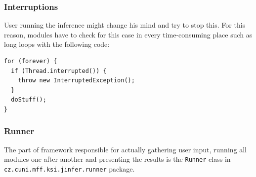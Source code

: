 \documentclass[a4paper,10pt,oneside]{article}
\newcommand{\code}[1]{\texttt{#1}}
\begin{document}
\subsubsection{Interruptions}
User running the inference might change his mind and try to stop this. For this reason, modules have to check for this case in every time-consuming place such as long loops with the following code:
\begin{verbatim}
for (forever) {
  if (Thread.interrupted()) {
    throw new InterruptedException();
  }
  doStuff();
}
\end{verbatim}

\subsubsection{Runner} \label{section_runner}
The part of framework responsible for actually gathering user input, running all modules one after another and presenting the results is the \code{Runner} class  in \code{cz.cuni.mff.ksi.jinfer.runner} package.
\end{document}

